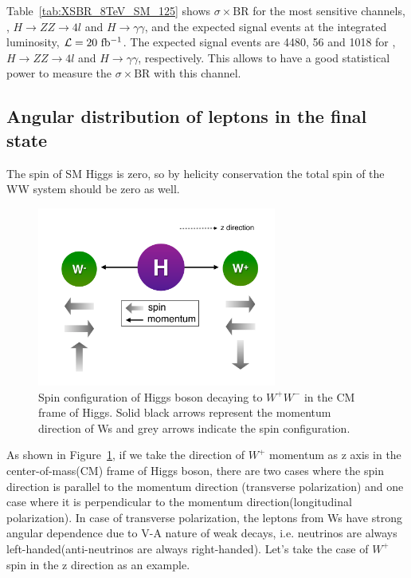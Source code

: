 Table~\ref{tab:XSBR_8TeV_SM_125} shows $\sigma \times \textrm{BR}$ for 
the most sensitive channels, \hww, $H \rightarrow ZZ\rightarrow 4l$
and $H \rightarrow\gamma\gamma$, and the expected signal events at
the integrated luminosity, $\mathcal{L}=20~\mathrm{fb^{-1}}$. The expected signal 
events are 4480, 56 and 1018 for \hww, $H \rightarrow ZZ\rightarrow 4l$
and $H \rightarrow\gamma\gamma$, respectively. This allows to have a 
good statistical power to measure the $\sigma \times \textrm{BR}$
with this channel. 

%
\subsection{Angular distribution of leptons in the final state}
\label{subsec:angular_dist}

The spin of SM Higgs is zero, so by helicity conservation the total spin 
of the WW system should be zero as well. 
\begin{figure}[htp]
\centering
\includegraphics[width=0.7\textwidth]{figures/HiggsSpin.pdf}
\caption{Spin configuration of Higgs boson decaying to $W^+W^-$ in the CM frame of Higgs.
Solid black arrows represent the momentum direction of Ws and grey arrows indicate 
the spin configuration.}
\label{fig:HiggsSpin}
\end{figure}
As shown in Figure~\ref{fig:HiggsSpin}, if we take 
the direction of $W^+$ momentum as z axis in the center-of-mass(CM) frame of Higgs boson,
there are two cases where the spin direction is parallel to the 
momentum direction (transverse polarization) and one case where 
it is perpendicular to the momentum direction(longitudinal polarization). 
In case of transverse polarization, the leptons from Ws have strong 
angular dependence due to V-A nature of weak decays, i.e. neutrinos 
are always left-handed(anti-neutrinos are always right-handed). 
Let's take the case of $W^+$ spin in the z direction as an example.

